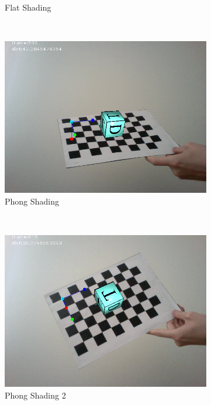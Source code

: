 \begin{figure}[h!]
\begin{subfigure}[b]{0.5\textwidth}
		\caption{Flat Shading}
		\label{subfig:flatshading}
	\end{subfigure}
	~
	\begin{subfigure}[b]{0.5\textwidth}
		\includegraphics[width=\textwidth]{final/images/phong1.png}
		\caption{Phong Shading}
		\label{subfig:phongshading}
	\end{subfigure}
	~
	\begin{subfigure}[b]{0.5\textwidth}
		\includegraphics[width=\textwidth]{final/images/phong2.png}
		\caption{Phong Shading 2}
		\label{subfig:phongshading2}
	\end{subfigure}
	~
	\begin{subfigure}[b]{0.5\textwidth}

\end{subfigure}
\end{figure}
